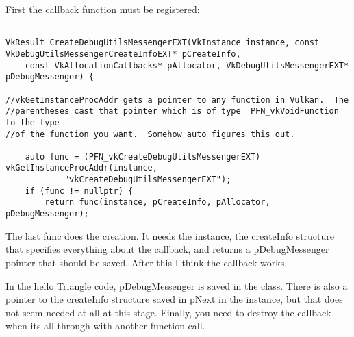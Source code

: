 \documentclass{article}
\begin{document}
First the callback function must be registered:
\begin{verbatim}

VkResult CreateDebugUtilsMessengerEXT(VkInstance instance, const VkDebugUtilsMessengerCreateInfoEXT* pCreateInfo, 
    const VkAllocationCallbacks* pAllocator, VkDebugUtilsMessengerEXT* pDebugMessenger) {
    
//vkGetInstanceProcAddr gets a pointer to any function in Vulkan.  The
//parentheses cast that pointer which is of type  PFN_vkVoidFunction to the type
//of the function you want.  Somehow auto figures this out.

	auto func = (PFN_vkCreateDebugUtilsMessengerEXT) vkGetInstanceProcAddr(instance, 
			"vkCreateDebugUtilsMessengerEXT");
    if (func != nullptr) {
        return func(instance, pCreateInfo, pAllocator, pDebugMessenger);
\end{verbatim}
The last func does the creation.  It needs the instance, the createInfo
structure that specifies everything about the callback, and returns a
pDebugMessenger pointer that should be saved.  After this I think the callback
works.  

In the hello Triangle code, pDebugMessenger is saved in the class.  There is
also a pointer to the createInfo structure saved in pNext in the instance, but
that does not seem needed at all at this stage.  Finally, you need to destroy
the callback when its all through with another function call.
\end{document}

